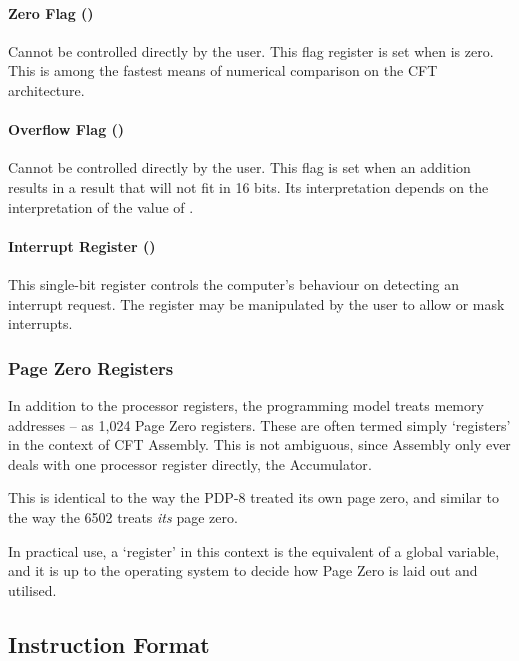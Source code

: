 \paragraph{Zero Flag (\Zreg)}

Cannot be controlled directly by the user. This flag register is set
when \A{} is zero. This is among the fastest means of numerical
comparison on the CFT architecture.

\paragraph{Overflow Flag (\Vreg)}

Cannot be controlled directly by the user. This flag is set when an
addition results in a result that will not fit in 16 bits. Its
interpretation depends on the interpretation of the value of \A.

\paragraph{Interrupt Register (\Ireg)}

This single-bit register controls the computer's behaviour on
detecting an interrupt request. The register may be manipulated by the
user to allow or mask interrupts.


\subsubsection{Page Zero Registers}

In addition to the processor registers, the programming model treats memory
addresses – as 1,024 \gls{Page Zero} registers. These are
often termed simply ‘registers’ in the context of CFT Assembly. This is not
ambiguous, since Assembly only ever deals with one processor register directly,
the \gls{Accumulator}.

This is identical to the way the PDP-8 treated its own page zero, and similar
to the way the 6502 treats {\em its\/} page zero.

In practical use, a ‘register’ in this context is the equivalent of a global
variable, and it is up to the operating system to decide how \gls{Page Zero} is
laid out and utilised.

\subsection{Instruction Format}
\label{sec:instruction-format}

